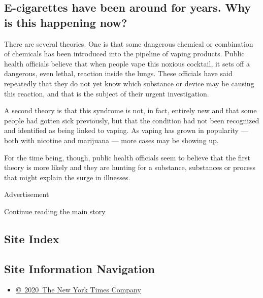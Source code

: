 \hypertarget{e-cigarettes-have-been-around-for-years-why-is-this-happening-now}{%
\subsection{E-cigarettes have been around for years. Why is this
happening
now?}\label{e-cigarettes-have-been-around-for-years-why-is-this-happening-now}}

There are several theories. One is that some dangerous chemical or
combination of chemicals has been introduced into the pipeline of vaping
products. Public health officials believe that when people vape this
noxious cocktail, it sets off a dangerous, even lethal, reaction inside
the lungs. These officials have said repeatedly that they do not yet
know which substance or device may be causing this reaction, and that is
the subject of their urgent investigation.

A second theory is that this syndrome is not, in fact, entirely new and
that some people had gotten sick previously, but that the condition had
not been recognized and identified as being linked to vaping. As vaping
has grown in popularity --- both with nicotine and marijuana --- more
cases may be showing up.

For the time being, though, public health officials seem to believe that
the first theory is more likely and they are hunting for a substance,
substances or process that might explain the surge in illnesses.

Advertisement

\protect\hyperlink{after-bottom}{Continue reading the main story}

\hypertarget{site-index}{%
\subsection{Site Index}\label{site-index}}

\hypertarget{site-information-navigation}{%
\subsection{Site Information
Navigation}\label{site-information-navigation}}

\begin{itemize}
\tightlist
\item
  \href{https://help.nytimes3xbfgragh.onion/hc/en-us/articles/115014792127-Copyright-notice}{©~2020~The
  New York Times Company}
\end{itemize}


